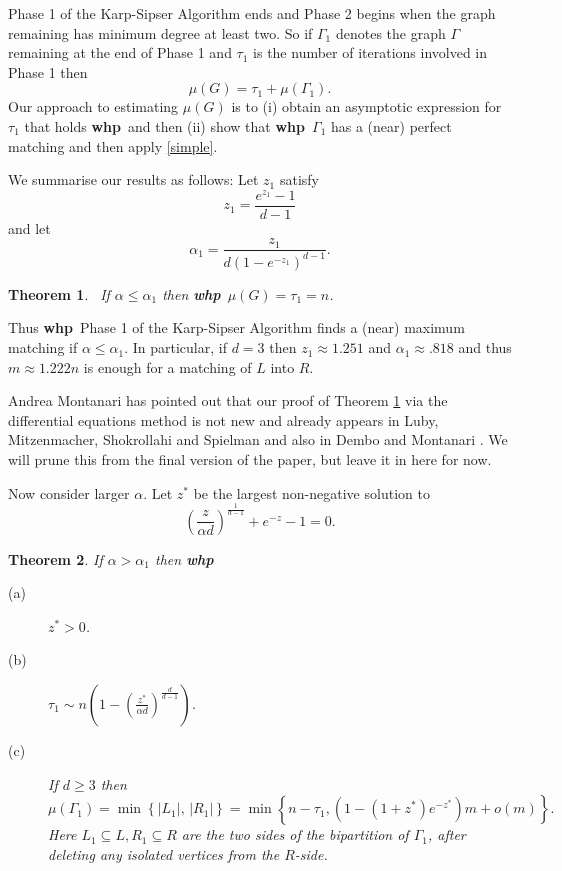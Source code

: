 \documentclass[11pt]{article}
\def\a{\alpha}
\def\G{\Gamma}
\def\m{\mu}
\def\t{\tau}
\def\whp{{\bf whp}}
\newcommand{\set}[1]{\left\{#1\right\}}
\newtheorem{theorem}{Theorem}
\newcommand{\brac}[1]{\left(#1\right)}
\newcommand{\bfrac}[2]{\brac{\frac{#1}{#2}}}
\newcommand{\beq}[1]{\begin{equation}\label{#1}}
\newcommand{\eeq}{\end{equation}}
\begin{document}
Phase 1 of the Karp-Sipser Algorithm ends and Phase 2 begins when the graph remaining has minimum degree at least two. 
So if $\G_1$ denotes the graph $\G$ remaining at the end of
Phase 1 and $\t_1$ is the number of iterations involved in Phase 1 then
\beq{simple}
\m(G)=\t_1+\m(\G_1).
\eeq
Our approach to estimating $\m(G)$ is to (i) obtain an asymptotic expression for $\t_1$ that holds \whp\ and then (ii) show that 
\whp\ $\G_1$ has a (near) perfect matching and then apply \eqref{simple}.

We summarise our results as follows: Let $z_1$ satisfy 
\beq{zaa}
z_1=\frac{e^{z_1}-1}{d-1}
\eeq
and let
\beq{azaa}
\a_1=\frac{z_1}{d(1-e^{-z_1})^{d-1}}.
\eeq
\begin{theorem}\label{th1}\ 
If $\a\leq\a_1$ then \whp\ $\m(G)=\t_1=n$.
\end{theorem}
Thus \whp\ Phase 1 of the Karp-Sipser Algorithm finds a (near) maximum matching if $\a\leq \a_1$.
In particular, if $d=3$ then $z_1\approx 1.251$ and $\a_1\approx .818$ and thus $m\approx 1.222n$ is enough for a
matching of $L$ into $R$.

Andrea Montanari has pointed out that our proof of Theorem \ref{th1} via the differential equations method is not
new and already appears in Luby, Mitzenmacher, Shokrollahi and Spielman \cite{LMSS} and also in Dembo and Montanari \cite{DeMo}.
We will prune this from the final version of the paper, but leave it in here for now.

Now consider larger $\a$. Let $z^*$ be the largest non-negative solution to 
$$\bfrac{z}{\a d}^{\frac{1}{d-1}} + e^{-z}-1=0.$$
\begin{theorem}\label{th2}
If $\a>\a_1$ then \whp
\begin{description}
\item[(a)] $z^*>0$.
\item[(b)] $\t_1\sim n\brac{1-\bfrac{z^*}{\a d}^{\frac{d}{d-1}}}$.
\item[(c)] If $d\geq 3$ then
\beq{match}
\m(\G_1)=\min\set{|L_1|,\,|R_1|}=\min\set{n-\t_1,(1-(1+z^*)e^{-z^*})m+o(m)}.
\eeq
Here $L_1\subseteq L, R_1\subseteq R$ are the two sides of the bipartition of $\G_1$, after deleting any isolated vertices from the 
$R$-side.
\end{description}
\end{theorem}
\end{document}

